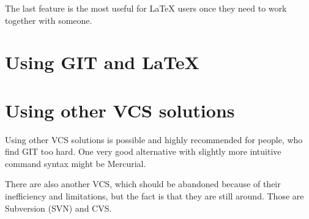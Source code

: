 The last feature is the most useful for \LaTeX{} users once they need to work
together with someone.

\section{Using GIT and \LaTeX{}}

\section{Using other VCS solutions}

Using other VCS solutions is possible and highly recommended for people, who
find GIT too hard. One very good alternative with slightly more intuitive
command syntax might be Mercurial.

There are also another VCS, which should be abandoned because of their
inefficiency and limitations, but the fact is that they are still around. Those
are Subversion (SVN) and CVS.





